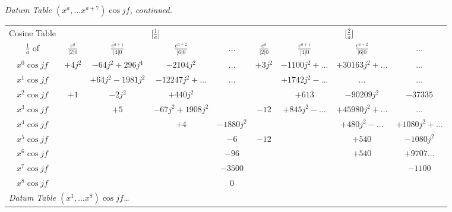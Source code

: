 \documentclass[12pt,a4paper]{article}
\theoremstyle{plain}
\begin{document}

\newpage
{}

\begin{center}
\textit{Datum Table $(x^{a},\ldots x^{a+7})\cos jf$, continued.}
\smallskip

\small
\begin{tabular}{|c|c c c c|c c c c|}
\hline
Cosine Table & \multicolumn{4}{c|}{$\bigl[\frac{1}{a}\bigr]$} & \multicolumn{4}{c|}{$\bigl[\frac{2}{a}\bigr]$} \\
$\frac{1}{a}$ of \quad & $\frac{e^{a}}{|2|0}$ & $\frac{e^{a+1}}{|4|0}$ & $\frac{e^{a+2}}{|6|0}$ & $\ldots$ & $\frac{e^{a}}{|2|0}$ & $\frac{e^{a+1}}{|4|0}$ & $\frac{e^{a+2}}{|6|0}$ & $\ldots$ \\
\hline
$x^{0}\cos jf$ & $+4j^{2}$ & $-64j^{2}+296j^{4}$ & $-2104j^{2}$    & $\ldots$ & $+3j^{2}$ & $-1100j^{2}+\ldots$ & $+30163j^{2}+\ldots$ & $\ldots$ \\
$x^{1}\cos jf$ &           & $+64j^{2}-1981j^{2}$ & $-12247j^{2}+\ldots$ & $\ldots$ &      & $+1742j^{2}-\ldots$ & $\ldots$ & $\ldots$ \\
$x^{2}\cos jf$ & $+1$      & $-2j^{2}$       & $+440j^{2}$         &          &      & $+613$ &    $-90209j^{2}$ & $-37335$ \\
$x^{3}\cos jf$ &           & $+5$            & $-67j^{2}+1908j^{2}$ &          & $-12$ & $+845j^{2}-\ldots$ & $+45980j^{2}+\ldots$ & $\ldots$ \\
$x^{4}\cos jf$ &           &                 & $+4$ & $-1880j^{2}$  &           &      & $+480j^{2}-\ldots$ & $+1080j^{2}+\ldots$ \\
$x^{5}\cos jf$ &           &                 &      & $-6$          & $-12$ &      & $+540$ &    $-1080j^{2}$ \\
$x^{6}\cos jf$ &           &                 &      & $-96$         &           &      & $+540$ &   $+9707\ldots$ \\
$x^{7}\cos jf$ &           &                 &      & $-3500$       &           &      &        &   $-1100$ \\
$x^{8}\cos jf$ &           &                 &      & $0$           &           &      &        &       \\
\hline
\multicolumn{9}{|l|}{\textit{Datum Table $(x^{1},\ldots x^{8})\cos jf$\ldots}}\\
\hline
\end{tabular}
\end{center}
\end{document}
